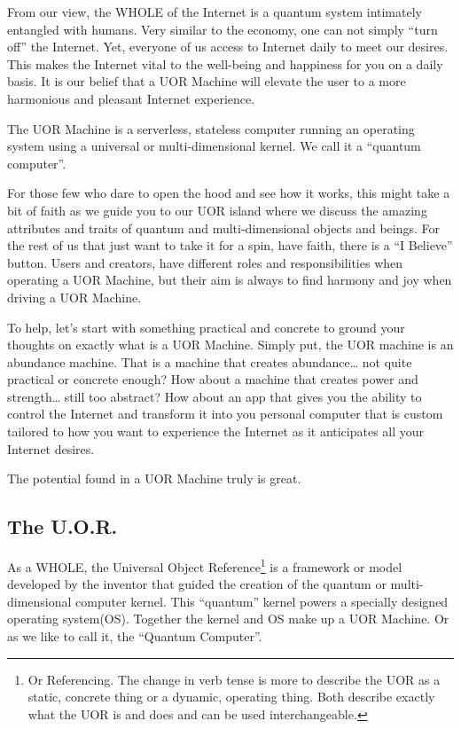 \documentclass[twocolumn,10pt]{article}
\begin{document}
From our view, the WHOLE of the Internet is a quantum system intimately entangled with humans.
Very similar to the economy, one can not simply ``turn off'' the Internet.
Yet, everyone of us access to Internet daily to meet our desires.
This makes the Internet vital to the well-being and happiness for you on a daily basis.
It is our belief that a UOR Machine will elevate the user to a more harmonious and pleasant Internet experience.

The UOR Machine is a serverless, stateless computer running an operating system using a universal or multi-dimensional kernel.
We call it a ``quantum computer''.

For those few who dare to open the hood and see how it works, this might take a bit of faith as we guide you to our UOR island where we discuss the amazing attributes and traits of quantum and multi-dimensional objects and beings.
For the rest of us that just want to take it for a spin, have faith, there is a ``I Believe'' button.
Users and creators, have different roles and responsibilities when operating a UOR Machine, but their aim is always to find harmony and joy when driving a UOR Machine.

To help, let's start with something practical and concrete to ground your thoughts on exactly what is a UOR Machine.
Simply put, the UOR machine is an abundance machine.
That is a machine that creates abundance\ldots
not quite practical or concrete enough?
How about a machine that creates power and strength\ldots
still too abstract?
How about an app that gives you the ability to control the Internet and transform it into you personal computer that is custom tailored to how you want to experience the Internet as it anticipates all your Internet desires.

The potential found in a UOR Machine truly is great.

\subsection*{The U.O.R.}
As a WHOLE, the Universal Object Reference\footnote{Or Referencing. The change in verb tense is more to describe the UOR as a static, concrete thing or a dynamic, operating thing. Both describe exactly what the UOR is and does and can be used interchangeable.} is a framework or model developed by the inventor that guided the creation of the quantum or multi-dimensional computer kernel.
This ``quantum'' kernel powers a specially designed operating system(OS).
Together the kernel and OS make up a UOR Machine.
Or as we like to call it, the ``Quantum Computer''.
\end{document}
